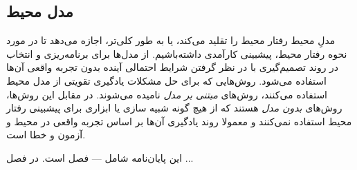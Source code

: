 \subsection{مدل محیط}

مدلِ محیط رفتار محیط را تقلید می‌کند، یا به طور کلی‌تر، اجازه می‌دهد تا در مورد نحوه رفتار محیط، پیشبینی کارآمدی داشته‌باشیم. از مدل‌ها برای برنامه‌ریزی و انتخاب در روند تصمیم‌گیری  با در نظر گرفتن شرایط احتمالی آینده بدون تجربه واقعی آن‌ها استفاده می‌شود.
روش‌هایی که برای حل مشکلات یادگیری تقویتی از مدل‌ محیط استفاده می‌کنند، روش‌های
 \textit{مبتنی بر مدل}
نامیده می‌شوند. در مقابل این روش‌ها، روش‌های 
\textit{بدون مدل}
هستند که از هیچ گونه شبیه سازی  یا ابزاری برای پیشبینی رفتار محیط استفاده نمی‌کنند و معمولا روند یادگیری آن‌ها بر اساس تجربه واقعی در محیط و آزمون و خطا است.




این پایان‌نامه شامل --- فصل است. در فصل ...
